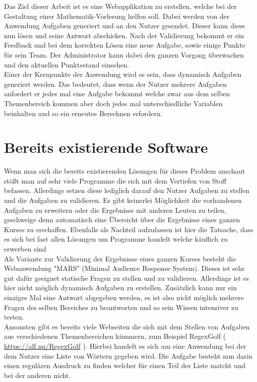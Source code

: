 Das Ziel dieser Arbeit ist es eine Webapplikation zu erstellen, welche bei der Gestaltung einer Mathematik-Vorlesung helfen soll. Dabei werden von der Anwendung Aufgaben generiert und an den Nutzer gesendet. Dieser kann diese nun lösen und seine Antwort abschicken. Nach der Validierung bekommt er ein Feedback und bei dem korrekten Lösen eine neue Aufgabe, sowie einige Punkte für sein Team. Der Administrator kann dabei den ganzen Vorgang überwachen und den aktuellen Punktestand einsehen. \\
Einer der Kernpunkte der Anwendung wird es sein, dass dynamisch Aufgaben generiert werden. Das bedeutet, dass wenn der Nutzer mehrere Aufgaben anfordert er jedes mal eine Aufgabe bekommt welche zwar aus dem selben Themenbereich kommen aber doch jedes mal unterschiedliche Variablen beinhalten und so ein erneutes Berechnen erfordern.


\section{Bereits existierende Software}

Wenn man sich die bereits existierenden Lösungen für dieses Problem anschaut stößt man auf sehr viele Programme die sich mit dem Vertiefen von Stoff befassen. Allerdings setzen diese lediglich darauf den Nutzer Aufgaben zu stellen und die Aufgaben zu validieren. Es gibt keinerlei Möglichkeit die vorhandenen Aufgaben zu erweitern oder die Ergebnisse mit anderen Leuten zu teilen, geschweige denn automatisch eine Übersicht über die Ergebnisse eines ganzen Kurses zu erschaffen. Ebenfalls als Nachteil aufzufassen ist hier die Tatsache, dass es sich bei fast allen Lösungen um Programme handelt welche käuflich zu erwerben sind\\

Als Variante zur Validierung der Ergebnisse eines ganzen Kurses besteht die Webanwendung "MARS" (Minimal Audience Response System). Dieses ist sehr gut dafür geeignet statische Fragen zu stellen und zu validieren. Allerdings ist es hier nicht möglich dynamisch Aufgaben zu erstellen. Zusätzlich kann nur ein einziges Mal eine Antwort abgegeben werden, es ist also nicht möglich mehrere Fragen des selben Bereiches zu beantworten und so sein Wissen intensiver zu testen. \\

Ansonsten gibt es bereits viele Webseiten die sich mit dem Stellen von Aufgaben aus verschiedenen Themenbereichen kümmern, zum Beispiel RegexGolf ( \url{https://alf.nu/RegexGolf} ). Hierbei handelt es sich um eine Anwendung bei der dem Nutzer eine Liste von Wörtern gegeben wird. Die Aufgabe besteht nun darin einen regulären Ausdruck zu finden welcher für einen Teil der Liste matcht und bei der anderen nicht.

